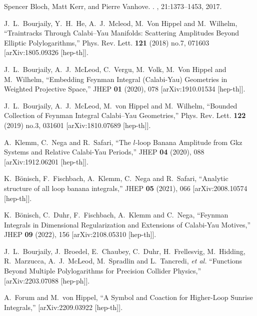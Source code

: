 \documentclass[a4paper,12pt]{article}
\numberwithin{equation}{section}
\numberwithin{figure}{section}
\begin{document}
\begin{thebibliography}{99}
Spencer Bloch, Matt Kerr, and Pierre Vanhove.
.
, 21:1373--1453, 2017.
\newblock [arXiv:1601.08181]

J.~L.~Bourjaily, Y.~H.~He, A.~J.~Mcleod, M.~Von Hippel and M.~Wilhelm,
``Traintracks Through Calabi--Yau Manifolds: Scattering Amplitudes Beyond Elliptic Polylogarithms,''
Phys. Rev. Lett. \textbf{121} (2018) no.7, 071603
[arXiv:1805.09326 [hep-th]].
  

J.~L.~Bourjaily, A.~J.~McLeod, C.~Vergu, M.~Volk, M.~Von Hippel and M.~Wilhelm,
``Embedding Feynman Integral (Calabi-Yau) Geometries in Weighted Projective Space,''
JHEP \textbf{01} (2020), 078
[arXiv:1910.01534 [hep-th]].

J.~L.~Bourjaily, A.~J.~McLeod, M.~von Hippel and M.~Wilhelm,
``Bounded Collection of Feynman Integral Calabi--Yau Geometries,''
Phys. Rev. Lett. \textbf{122} (2019) no.3, 031601
[arXiv:1810.07689 [hep-th]].

A.~Klemm, C.~Nega and R.~Safari,
``The $l$-loop Banana Amplitude from Gkz Systems and Relative Calabi-Yau Periods,''
JHEP \textbf{04} (2020), 088
[arXiv:1912.06201 [hep-th]].

K.~B\"onisch, F.~Fischbach, A.~Klemm, C.~Nega and R.~Safari,
``Analytic structure of all loop banana integrals,''
JHEP \textbf{05} (2021), 066
[arXiv:2008.10574 [hep-th]].


K.~B\"onisch, C.~Duhr, F.~Fischbach, A.~Klemm and C.~Nega,
``Feynman Integrals in Dimensional Regularization and Extensions of Calabi-Yau Motives,''
JHEP \textbf{09} (2022), 156
[arXiv:2108.05310 [hep-th]].

J.~L.~Bourjaily, J.~Broedel, E.~Chaubey, C.~Duhr, H.~Frellesvig, M.~Hidding, R.~Marzucca, A.~J.~McLeod, M.~Spradlin and L.~Tancredi, \textit{et al.}
``Functions Beyond Multiple Polylogarithms for Precision Collider Physics,''
[arXiv:2203.07088 [hep-ph]].


A.~Forum and M.~von Hippel,
``A Symbol and Coaction for Higher-Loop Sunrise Integrals,''
[arXiv:2209.03922 [hep-th]].


\end{thebibliography}
\end{document}
